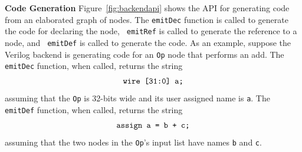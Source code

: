 {\bf Code Generation} Figure~\ref{fig:backendapi} shows the API for
generating code from an elaborated graph of nodes. The {\tt emitDec}
function is called to generate the code for declaring the node, {\tt
emitRef} is called to generate the reference to a node, and {\tt
emitDef} is called to generate the code. As an example, suppose the
Verilog backend is generating code for an {\tt Op} node that performs
an add. The {\tt emitDec} function, when called, returns the
string
\begin{align*}
\centering
\text{\tt{wire [31:0] a;}}
\end{align*}
assuming that the {\tt Op} is 32-bits wide and its user assigned name
is {\tt a}. The {\tt emitDef} function, when called, returns the
string
\begin{align*}
\centering
\text{\tt{assign a = b + c;}}
\end{align*}
assuming that the two nodes in the {\tt Op}'s input list have names
{\tt b} and {\tt c}.

\cite{Bachrach:2012}
